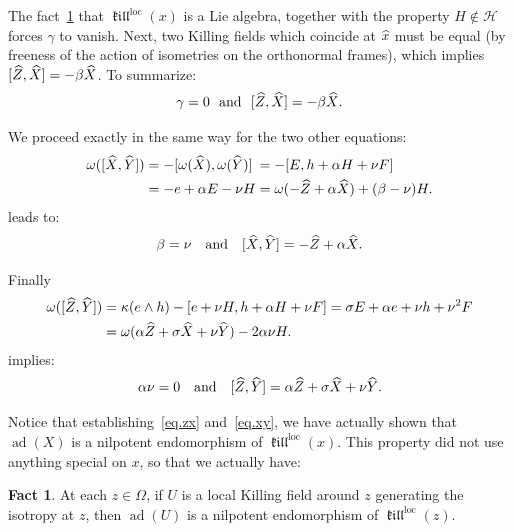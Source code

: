 \documentclass[11pt]{article}
\theoremstyle{definition}
\numberwithin{equation}{section}
\numberwithin{figure}{section}
\numberwithin{table}{section}
\newtheorem{fact}[theo]{Fact} }
\DeclareMathOperator{\ad}{ad}
\DeclareMathOperator{\loc}{loc}
\DeclareMathOperator{\kil}{{\mathfrak{kill}}}
\newcommand{\kiloc}{\kil^{\loc}}
\newcommand{\hx}{{\hat{x}}}
\newcommand{\ka}{{\kappa}}
\let\oldhat\hat
\renewcommand*\hat[1]{\mathchoice{\widehat{#1}}{\widehat{#1}}{\widehat{#1}}{\oldhat{#1}}}
\begin{document}
The fact~\ref{fait.nilpotent} that $\kiloc(x)$ is a Lie algebra, together with the property $H \not \in {\mathcal H}$ forces $\gamma$ to vanish. Next, two Killing fields which coincide at $\hx$ must be equal (by freeness of the action of isometries on the orthonormal frames), which implies $[\hat{Z},\hat{X}]= - \beta \hat{X}$. To summarize:
\begin{equation}\label{eq.zx}
\gamma =0\ \text{ and }\ [\hat{Z},\hat{X}]= - \beta \hat{X}.
\end{equation}

We proceed exactly in the same way for the two other equations:
\begin{align*}
\omega([\hat{X},\hat{Y}])& = -[\omega(\hat{X}),\omega(\hat{Y})]\:=-[E, h + \alpha H + \nu F] \\
&= - e + \alpha E - \nu H = \omega(-\hat{Z} + \alpha \hat{X}) +(\beta - \nu) H.
\end{align*}
leads to:
\begin{equation}\label{eq.xy}
\beta=\nu \quad \text{and}\quad [\hat{X},\hat{Y}]=-\hat{Z}+ \alpha \hat{X}.
\end{equation}

Finally
\begin{align*}
\omega([\hat{Z},\hat{Y}])& = \ka(e \wedge h)-[e+ \nu H, h + \alpha H + \nu F]=\sigma E + \alpha e + \nu h + \nu^2 F \\
&= \omega(\alpha \hat{Z} + \sigma \hat{X} + \nu \hat{Y}) -2 \alpha \nu H.
\end{align*}
implies:
\begin{equation}\label{eq.zy}
\alpha \nu =0 \quad\text{and}\quad [\hat{Z},\hat{Y}]= \alpha \hat{Z} + \sigma \hat{X} + \nu \hat{Y}.
\end{equation}

Notice that establishing~\eqref{eq.zx} and~\eqref{eq.xy}, we have actually shown that $\ad(X)$ is a nilpotent endomorphism of $\kiloc(x)$. This property did not use anything special on $x$, so that we actually have:
\begin{fact}\label{fait.nilpotent}
At each $z \in \Omega$, if $U$ is a local Killing field around $z$ generating the isotropy at $z$, then $\ad(U)$ is a nilpotent endomorphism of $\kiloc(z)$.
\end{fact}
\end{document}
